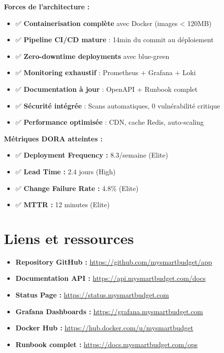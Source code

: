 \begin{tcolorbox}[colback=blue!5!white,colframe=blue!60!black,title=\textbf{Points clés de l'infrastructure DevOps}]
\textbf{Forces de l'architecture :}
\begin{itemize}
    \item ✅ \textbf{Containerisation complète} avec Docker (images < 120MB)
    \item ✅ \textbf{Pipeline CI/CD mature} : 14min du commit au déploiement
    \item ✅ \textbf{Zero-downtime deployments} avec blue-green
    \item ✅ \textbf{Monitoring exhaustif} : Prometheus + Grafana + Loki
    \item ✅ \textbf{Documentation à jour} : OpenAPI + Runbook complet
    \item ✅ \textbf{Sécurité intégrée} : Scans automatiques, 0 vulnérabilité critique
    \item ✅ \textbf{Performance optimisée} : CDN, cache Redis, auto-scaling
\end{itemize}

\textbf{Métriques DORA atteintes :}
\begin{itemize}
    \item ✅ \textbf{Deployment Frequency :} 8.3/semaine (Elite)
    \item ✅ \textbf{Lead Time :} 2.4 jours (High)
    \item ✅ \textbf{Change Failure Rate :} 4.8\% (Elite)  
    \item ✅ \textbf{MTTR :} 12 minutes (Elite)
\end{itemize}
\end{tcolorbox}

\section{Liens et ressources}

\begin{itemize}
    \item \textbf{Repository GitHub :} \url{https://github.com/mysmartbudget/app}
    \item \textbf{Documentation API :} \url{https://api.mysmartbudget.com/docs}
    \item \textbf{Status Page :} \url{https://status.mysmartbudget.com}
    \item \textbf{Grafana Dashboards :} \url{https://grafana.mysmartbudget.com}
    \item \textbf{Docker Hub :} \url{https://hub.docker.com/u/mysmartbudget}
    \item \textbf{Runbook complet :} \url{https://docs.mysmartbudget.com/ops}
\end{itemize}

